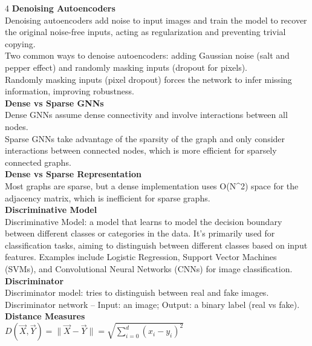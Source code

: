 \documentclass[8pt]{extarticle}
\begin{document}
\begin{multicols}{4}
\vspace{2pt}\textbf{Denoising Autoencoders}\\
Denoising autoencoders add noise to input images and train the model to recover the original noise-free inputs, acting as regularization and preventing trivial copying.\\
Two common ways to denoise autoencoders: adding Gaussian noise (salt and pepper effect) and randomly masking inputs (dropout for pixels).\\
Randomly masking inputs (pixel dropout) forces the network to infer missing information, improving robustness.\\
\vspace{2pt}\textbf{Dense vs Sparse GNNs}\\
Dense GNNs assume dense connectivity and involve interactions between all nodes.\\
Sparse GNNs take advantage of the sparsity of the graph and only consider interactions between connected nodes, which is more efficient for sparsely connected graphs.\\
\vspace{2pt}\textbf{Dense vs Sparse Representation}\\
Most graphs are sparse, but a dense implementation uses O(N\textasciicircum{}2) space for the adjacency matrix, which is inefficient for sparse graphs.\\
\vspace{2pt}\textbf{Discriminative Model}\\
Discriminative Model: a model that learns to model the decision boundary between different classes or categories in the data. It's primarily used for classification tasks, aiming to distinguish between different classes based on input features. Examples include Logistic Regression, Support Vector Machines (SVMs), and Convolutional Neural Networks (CNNs) for image classification.\\
\vspace{2pt}\textbf{Discriminator}\\
Discriminator model: tries to distinguish between real and fake images.\\
Discriminator network -- Input: an image; Output: a binary label (real vs fake).\\
\vspace{2pt}\textbf{Distance Measures}\\
$D(\vec{X},\vec{Y}) = \|\vec{X}-\vec{Y}\| = \sqrt{\sum_{i=0}^{d} (x_i - y_i)^2}$\\

\end{multicols}
\end{document}
